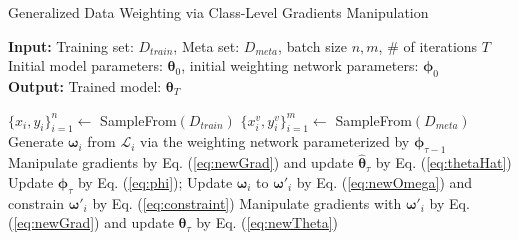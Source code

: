 %
\begin{algorithm}
\caption{Generalized Data Weighting via Class-Level Gradients Manipulation}\label{alg:GDW}
\hspace*{\algorithmicindent} \textbf{Input:} Training set: $D_{train}$, Meta set: $D_{meta}$, batch size $n,m$, \# of iterations $T$ \\
\hspace*{\algorithmicindent} Initial model parameters: $\boldsymbol \theta_0$, initial weighting network parameters: $\boldsymbol \phi_0$\\
\hspace*{\algorithmicindent} \textbf{Output:} Trained model: $\boldsymbol \theta_T$
\begin{algorithmic}[1]

\State $\{x_i, y_i\}_{i=1}^n\leftarrow$ SampleFrom$(D_{train})$
\State $\{x_i^v, y_i^v\}_{i=1}^m\leftarrow$ SampleFrom$(D_{meta})$
\State Generate $\boldsymbol \omega_i$ from $\mathcal{L}_i$ via the weighting network parameterized by $\boldsymbol \phi _{\tau-1}$
\State Manipulate gradients by Eq. (\ref{eq:newGrad}) and update $\hat{\boldsymbol \theta}_\tau$ by Eq. (\ref{eq:thetaHat})
\State Update $\boldsymbol \phi_\tau$ by Eq. (\ref{eq:phi}); 
\State Update $\boldsymbol \omega_i$ to $\boldsymbol \omega'_i$ by Eq. (\ref{eq:newOmega}) and constrain $\boldsymbol \omega'_i$ by Eq. (\ref{eq:constraint})
\State Manipulate gradients with $\boldsymbol \omega'_i$ by Eq. (\ref{eq:newGrad}) and update $\boldsymbol \theta_\tau$ by Eq. (\ref{eq:newTheta})
\EndFor
\end{algorithmic}
\end{algorithm}




